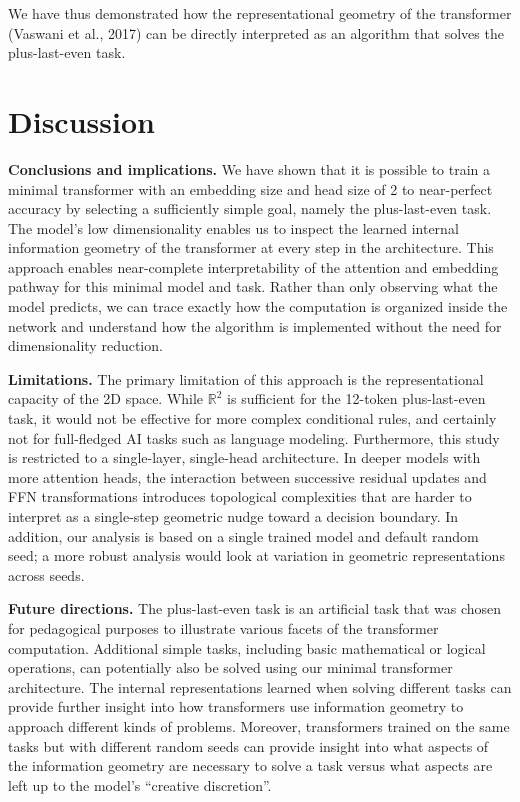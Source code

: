 \documentclass[
  11pt,
  a4paper,
]{article}
\begin{document}
We have thus demonstrated how the representational geometry of the
transformer (Vaswani et al., 2017) can be directly interpreted as an
algorithm that solves the plus-last-even task.

\section{Discussion}\label{discussion}

\textbf{Conclusions and implications.} We have shown that it is possible
to train a minimal transformer with an embedding size and head size of 2
to near-perfect accuracy by selecting a sufficiently simple goal, namely
the plus-last-even task. The model's low dimensionality enables us to
inspect the learned internal information geometry of the transformer at
every step in the architecture. This approach enables near-complete
interpretability of the attention and embedding pathway for this minimal
model and task. Rather than only observing what the model predicts, we
can trace exactly how the computation is organized inside the network
and understand how the algorithm is implemented without the need for
dimensionality reduction.

\textbf{Limitations.} The primary limitation of this approach is the
representational capacity of the 2D space. While \(\mathbb{R}^2\) is
sufficient for the 12-token plus-last-even task, it would not be
effective for more complex conditional rules, and certainly not for
full-fledged AI tasks such as language modeling. Furthermore, this study
is restricted to a single-layer, single-head architecture. In deeper
models with more attention heads, the interaction between successive
residual updates and FFN transformations introduces topological
complexities that are harder to interpret as a single-step geometric
nudge toward a decision boundary. In addition, our analysis is based on
a single trained model and default random seed; a more robust analysis
would look at variation in geometric representations across seeds.

\textbf{Future directions.} The plus-last-even task is an artificial
task that was chosen for pedagogical purposes to illustrate various
facets of the transformer computation. Additional simple tasks,
including basic mathematical or logical operations, can potentially also
be solved using our minimal transformer architecture. The internal
representations learned when solving different tasks can provide further
insight into how transformers use information geometry to approach
different kinds of problems. Moreover, transformers trained on the same
tasks but with different random seeds can provide insight into what
aspects of the information geometry are necessary to solve a task versus
what aspects are left up to the model's ``creative discretion''.
\end{document}
